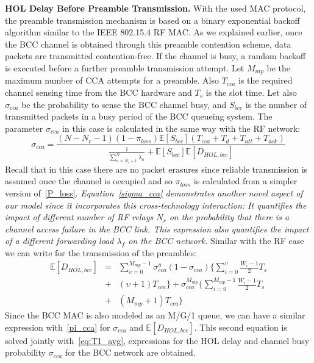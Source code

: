 \documentclass[10pt]{IEEEtran}
\begin{document}
\textbf{HOL Delay Before Preamble Transmission.} With the used MAC protocol, the preamble transmission mechanism is based on a binary exponential backoff algorithm similar to the IEEE 802.15.4 RF MAC. As we explained earlier, once the BCC channel is obtained through this preamble contention scheme, data packets are transmitted contention-free. If the channel is busy, a random backoff is executed before a further preamble transmission attempt. Let $M_{mp}$ be the maximum number of CCA attempts for a preamble. Also $T_{cca}$ is the required channel sensing time from the BCC hardware and $T_{s}$ is the slot time. Let also $\sigma_{cca}$ be the probability to sense the BCC channel busy, and $S_{bcc}$ is the number of transmitted packets in a busy period of the BCC queueing system. The parameter $\sigma_{cca}$ in this case is calculated in the same way with the RF network:
\begin{equation}\label{sigma_cca}
\sigma_{cca}=\frac{(N-N_r-1)(1-\pi_{loss})\mathbb{E}[S_{bcc}](T_{cca}+ T_{d} + T_{att} + T_{ack})}{\frac{1}{\sum_{n=N_r+1}^{N}\lambda_n}+\mathbb{E}[S_{bcc}]\mathbb{E}[D_{HOL,bcc}]}
\end{equation}			
Recall that in this case there are no packet erasures since reliable transmission is assumed once the channel is occupied and so $\pi_{loss}$ is calculated from a simpler version of~\eqref{P_loss}. \textit{Equation~\eqref{sigma_cca} demonstrates another novel aspect of our model since it incorporates this cross-technology interaction: It quantifies the impact of different number of RF relays $N_r$ on the probability that there is a channel access failure in the BCC link. This expression also quantifies the impact of a different forwarding load $\lambda_f$ on the BCC network.} Similar with the RF case we can write for the transmission of the preambles:
\begin{eqnarray}\label{eq:T1_avg}
   \mathbb{E}[D_{HOL,bcc}] &=&  \sum_{\upsilon=0}^{M_{mp}-1} \sigma_{cca}^{u}(1-\sigma_{cca}) \Big \{ \sum_{i=0}^{\upsilon}\frac{W_i-1}{2} T_{s}\nonumber \\
&+&     (\upsilon+1) T_{cca}\Big \}  +\sigma_{cca}^{M_{mp}}\Big \{ \sum_{i=0}^{M_{mp}-1}\frac{W_i-1}{2} T_{s}\nonumber\\
&+&(M_{mp}+1) T_{cca} \Big \}
\end{eqnarray}
Since the BCC MAC is also modeled as an M/G/1 queue, we can have a similar expression with~\eqref{pi_cca} for $\sigma_{cca}$ and $\mathbb{E}[D_{HOL,bcc}]$. This second equation is solved jointly with~\eqref{eq:T1_avg}, expressions for the HOL delay and channel busy probability $\sigma_{cca}$ for the BCC network are obtained.
\end{document}
